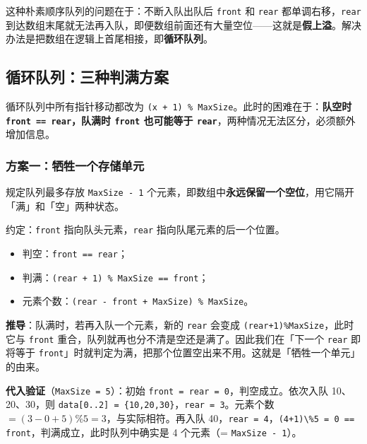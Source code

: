 \documentclass[11pt,openany,UTF8]{ctexbook}
\begin{document}
这种朴素顺序队列的问题在于：不断入队出队后 \texttt{front} 和 \texttt{rear} 都单调右移，\texttt{rear} 到达数组末尾就无法再入队，即便数组前面还有大量空位——这就是\textbf{假上溢}。解决办法是把数组在逻辑上首尾相接，即\textbf{循环队列}。

\subsection{循环队列：三种判满方案}

循环队列中所有指针移动都改为 \texttt{(x +\allowbreak{} 1)\allowbreak{} \% MaxSize}。此时的困难在于：\textbf{队空时 \texttt{front =\allowbreak{}=\allowbreak{} rear}，队满时 \texttt{front} 也可能等于 \texttt{rear}}，两种情况无法区分，必须额外增加信息。

\subsubsection{方案一：牺牲一个存储单元}

规定队列最多存放 \texttt{MaxSize - 1} 个元素，即数组中\textbf{永远保留一个空位}，用它隔开「满」和「空」两种状态。

约定：\texttt{front} 指向队头元素，\texttt{rear} 指向队尾元素的后一个位置。

\begin{itemize}
\item 判空：\texttt{front =\allowbreak{}=\allowbreak{} rear}；
\item 判满：\texttt{(rear +\allowbreak{} 1)\allowbreak{} \% MaxSize =\allowbreak{}=\allowbreak{} front}；
\item 元素个数：\texttt{(rear - front +\allowbreak{} MaxSize)\allowbreak{} \% MaxSize}。
\end{itemize}
\textbf{推导}：队满时，若再入队一个元素，新的 \texttt{rear} 会变成 \texttt{(rear+\allowbreak{}1)\allowbreak{}\%MaxSize}，此时它与 \texttt{front} 重合，队列就再也分不清是空还是满了。因此我们在「下一个 \texttt{rear} 即将等于 \texttt{front}」时就判定为满，把那个位置空出来不用。这就是「牺牲一个单元」的由来。

\textbf{代入验证}（\texttt{MaxSize =\allowbreak{} 5}）：初始 \texttt{front =\allowbreak{} rear =\allowbreak{} 0}，判空成立。依次入队 10、20、30，则 \texttt{data[0..2]\allowbreak{} =\allowbreak{} \{10,\allowbreak{}20,\allowbreak{}30\}}，\texttt{rear =\allowbreak{} 3}。元素个数 $=(3-0+5)\%5=3$，与实际相符。再入队 40，\texttt{rear =\allowbreak{} 4}，\texttt{(4+\allowbreak{}1)\allowbreak{}\textbackslash{}\%5 =\allowbreak{} 0 =\allowbreak{}=\allowbreak{} front}，判满成立，此时队列中确实是 4 个元素（= \texttt{MaxSize - 1}）。
\end{document}
